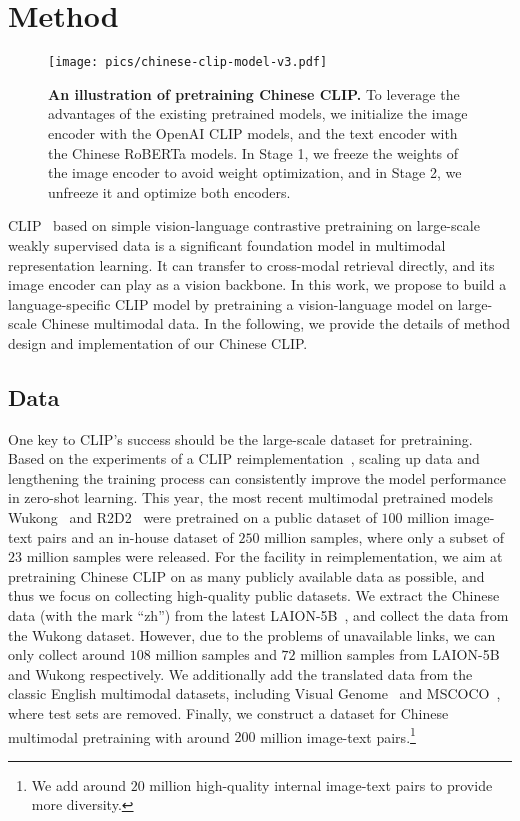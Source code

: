 \documentclass[11pt]{article}
\begin{document}
\section{Method}

\begin{figure}[t] 
    \centering
    \texttt{[image: pics/chinese-clip-model-v3.pdf]}
    \caption{\textbf{An illustration of pretraining Chinese CLIP.} To leverage the advantages of the existing pretrained models, we initialize the image encoder with the OpenAI CLIP models, and the text encoder with the Chinese RoBERTa models. In Stage 1, we freeze the weights of the image encoder to avoid weight optimization, and in Stage 2, we unfreeze it and optimize both encoders. }
    \label{fig:model}
\end{figure}

CLIP~\citep{clip} based on simple vision-language contrastive pretraining on large-scale weakly supervised data is a significant foundation model in multimodal representation learning. It can transfer to cross-modal retrieval directly, and its image encoder can play as a vision backbone. 
In this work, we propose to build a language-specific CLIP model by pretraining a vision-language model on large-scale Chinese multimodal data. 
In the following, we provide the details of method design and implementation of our Chinese CLIP. 






\subsection{Data}
One key to CLIP's success should be the large-scale dataset for pretraining. 
Based on the experiments of a CLIP reimplementation~\citep{openclip}, scaling up data and lengthening the training process can consistently improve the model performance in zero-shot learning. 
This year, the most recent multimodal pretrained models Wukong~\citep{wukong} and R2D2~\citep{r2d2} were pretrained on a public dataset of $100$ million image-text pairs and an in-house dataset of $250$ million samples, where only a subset of $23$ million samples were released. 
For the facility in reimplementation, we aim at pretraining Chinese CLIP on as many publicly available data as possible, and thus we focus on collecting high-quality public datasets. 
We extract the Chinese data (with the mark ``zh'') from the latest LAION-5B~\cite{schuhmann2021laion}, and collect the data from the Wukong dataset. 
However, due to the problems of unavailable links, we can only collect around $108$ million samples and $72$ million samples from LAION-5B and Wukong respectively. 
We additionally add the translated data from the classic English multimodal datasets, including Visual Genome~\cite{vg} and MSCOCO~\citep{coco_cap}, where test sets are removed. 
Finally, we construct a dataset for Chinese multimodal pretraining with around $200$ million image-text pairs.\footnote{We add around $20$ million high-quality internal image-text pairs to provide more diversity. } 
\end{document}
